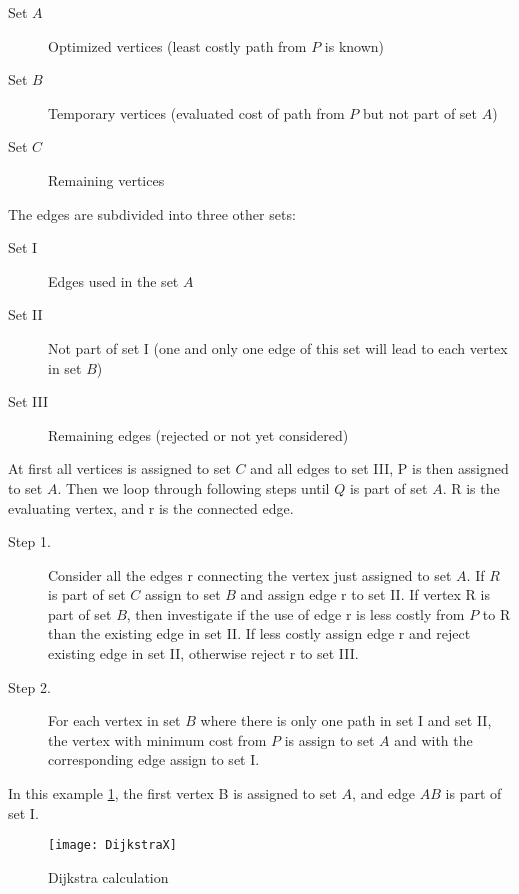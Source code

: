   \begin{description}
    \item[Set $A$]{Optimized vertices (least costly path from $P$ is known)}
    \item[Set $B$]{Temporary vertices (evaluated cost of path from $P$ but not part of set $A$)}
    \item[Set $C$]{Remaining vertices}
  \end{description}

  The edges are subdivided into three other sets:

  \begin{description}
    \item[Set \RN{1}]{Edges used in the set $A$}
    \item[Set \RN{2}]{Not part of set I (one and only one edge of this set will lead to each vertex in set $B$)}
    \item[Set \RN{3}]{Remaining edges (rejected or not yet considered)}
  \end{description}

  At first all vertices is assigned to set $C$ and all edges to set \RN{3}, P is then assigned to set $A$.
  Then we loop through following steps until $Q$ is part of set $A$. R is the evaluating vertex, and r is the connected edge.

  \begin{description}
    \item[Step 1.]{Consider all the edges r connecting the vertex just assigned to set $A$. If $R$ is part of set $C$ assign to set $B$ and assign edge r to set \RN{2}. If vertex R is part of set $B$, then investigate if the use of edge r is less costly from $P$ to R than the existing edge in set \RN{2}. If less costly assign edge r and reject existing edge in set \RN{2}, otherwise reject r to set \RN{3}.}
    \item[Step 2.]{For each vertex in set $B$ where there is only one path in set \RN{1} and set \RN{2}, the vertex with minimum cost from $P$ is assign to set $A$ and with the corresponding edge assign to set \RN{1}.}
  \end{description}



  In this example \cref{fig:dijkstra_calc}, the first vertex B is assigned to set $A$, and edge $AB$ is part of set \RN{1}.

  \begin{figure}[ht!]
    \centering
    \texttt{[image: DijkstraX]}
    \caption{Dijkstra calculation}
    \label{fig:dijkstra_calc}
  \end{figure}

